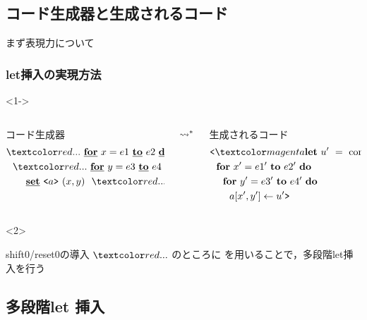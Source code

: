 \subsection{コード生成器と生成されるコード}

\begin{frame}
  \center
  \huge{まず表現力について}
\end{frame}

\begin{frame}
  \frametitle{let挿入の実現方法}

  \begin{visibleenv}<1->
    \begin{columns}
      \begin{column}{0.5\textwidth}%
        コード生成器
        \begin{align*}
          & \red{...}~ \cfordo{x = e1}{e2} \\
          & ~~\red{...}~ \cfordo{y = e3}{e4} \\
          & ~~~~~~\caryset{\code{a}}{(x,y)}~ \red{...}~ \text{comp calc}
        \end{align*}
      \end{column}
      $\leadsto^*$
      \begin{column}{0.5\textwidth}%
        生成されるコード
        \begin{align*}
          & \cbra \magenta{\Let ~u' ~= ~\text{comp calc}' ~\In} \\
          & ~~\fordo{x' = e1'}{e2'} \\
          & ~~~~\fordo{y' = e3'}{e4'} \\
          & ~~~~~~\aryset{a}{x',y'}{u'} \cket
        \end{align*}
      \end{column}
    \end{columns}
  \end{visibleenv}

  \begin{visibleenv}<2>
    \begin{exampleblock}{shift0/reset0の導入}
      $\red{...}$ のところに  を用いることで，多段階let挿入を行う
    \end{exampleblock}
  \end{visibleenv}
\end{frame}

\subsection{多段階let 挿入}

